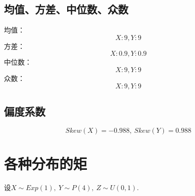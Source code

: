 \documentclass{article}
\begin{document}
\begin{CJK}{UTF8}{gbsn}
\subsection{均值、方差、中位数、众数}
均值：\\
$$ X:9,Y:9 $$
方差：\\
$$ X:0.9,Y:0.9 $$
中位数：\\
$$ X:9,Y:9 $$
众数：\\
$$ X:9,Y:9 $$
\subsection{偏度系数}
$$ Skew(X)=-0.988,\ Skew(Y)=0.988 $$
\section{各种分布的矩}
设$X\sim Exp(1),\ Y\sim P(4),\ Z\sim U(0,1)$.

\end{CJK}
\end{document}
